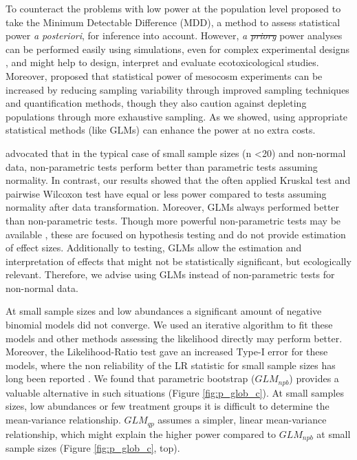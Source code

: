 \documentclass[twocolumn, natbib]{svjour3}
\providecommand{\DIFadd}[1]{{\protect\color{blue}\uwave{#1}}} %
\providecommand{\DIFdel}[1]{{\protect\color{red}\sout{#1}}}                      %
\providecommand{\DIFaddbegin}{} %
\providecommand{\DIFaddend}{} %
\providecommand{\DIFdelbegin}{} %
\providecommand{\DIFdelend}{} %
\begin{document}
To counteract the problems with low power at the population level \citet{brock_minimum_2015} proposed to take the Minimum Detectable Difference (MDD), a method to assess statistical power \emph{a posteriori}, for inference into account.
However, \emph{a \DIFdelbegin \DIFdel{priory}\DIFdelend \DIFaddbegin \DIFadd{priori}\DIFaddend } power analyses can be performed easily using simulations, even for complex experimental designs \citep{johnson_power_2014}, and might help to design, interpret and evaluate ecotoxicological studies.
Moreover, \citet{brock_minimum_2015} proposed that statistical power of mesocosm experiments can be increased by reducing sampling variability through improved sampling techniques and quantification methods, though they also caution against depleting populations through more exhaustive sampling.
As we showed, using appropriate statistical methods (like GLMs) can enhance the power at no extra costs.

\citet{wang_making_2011} advocated that in the typical case of small sample sizes (n \textless 20) and non-normal data, non-parametric tests perform better than parametric tests assuming normality.
In contrast, our results showed that the often applied Kruskal test and pairwise Wilcoxon test have equal or less power compared to tests assuming normality after data transformation.
Moreover, GLMs always performed better than non-parametric tests. 
Though more powerful non-parametric tests may be available \citep{konietschke_rank-based_2012}, these are focused on hypothesis testing and do not provide estimation of effect sizes.
Additionally to testing, GLMs allow the estimation and interpretation of effects that might not be statistically significant, but ecologically relevant.
Therefore, we advise using GLMs instead of non-parametric tests for non-normal data.

At small sample sizes and low abundances a significant amount of negative binomial models did not converge.
We used an iterative algorithm to fit these models \citep{venables_modern_2002} and other methods assessing the likelihood directly may perform better.
Moreover, the Likelihood-Ratio test gave an increased Type-I error for these models, where the non reliability of the LR statistic for small sample sizes has long been reported \citep{bolker_generalized_2009,wilks_large-sample_1938}. 
We found that parametric bootstrap ($GLM_{npb}$) provides a valuable alternative in such situations (Figure \ref{fig:p_glob_c}).
At small samples sizes, low abundances or few treatment groups it is difficult to determine the mean-variance relationship.
$GLM_{qp}$ assumes a simpler, linear mean-variance relationship, which might explain the higher power compared to $GLM_{npb}$ at small sample sizes (Figure \ref{fig:p_glob_c}, top).
\end{document}
